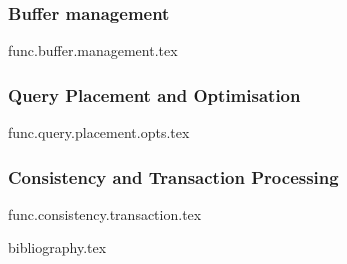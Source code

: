 \documentclass[a4paper, 11pt]{article}
\begin{document}
\subsubsection*{Buffer management}
{func.buffer.management.tex}

\subsubsection*{Query Placement and Optimisation}
{func.query.placement.opts.tex}

\subsubsection*{Consistency and Transaction Processing}
{func.consistency.transaction.tex}

\begin{thebibliography}{9}
{bibliography.tex}
\end{thebibliography}
\end{document}

